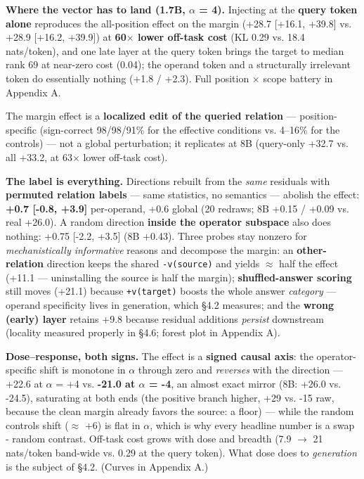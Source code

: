 \textbf{Where the vector has to land (1.7B, \ensuremath{\alpha} = 4).} Injecting at the
\textbf{query token alone} reproduces the all-position effect on the
margin (+28.7 {[}+16.1, +39.8{]} vs. +28.9 {[}+16.2, +39.9{]}) at
\textbf{60\ensuremath{\times} lower off-task cost} (KL 0.29 vs. 18.4 nats/token), and one
late layer at the query token brings the target to median rank 69 at
near-zero cost (0.04); the operand token and a structurally irrelevant
token do essentially nothing (+1.8 / +2.3). Full position \ensuremath{\times} scope
battery in Appendix A.

The margin effect is a \textbf{localized edit of the queried relation}
--- position-specific (sign-correct 98/98/91\% for the effective
conditions vs. 4--16\% for the controls) --- not a global perturbation;
it replicates at 8B (query-only +32.7 vs. all +33.2, at 63\ensuremath{\times} lower
off-task cost).

\textbf{The label is everything.} Directions rebuilt from the
\emph{same} residuals with \textbf{permuted relation labels} --- same
statistics, no semantics --- abolish the effect: \textbf{+0.7 {[}-0.8,
+3.9{]}} per-operand, +0.6 global (20 redraws; 8B +0.15 / +0.09 vs. real
+26.0). A random direction \textbf{inside the operator subspace} also
does nothing: +0.75 {[}-2.2, +3.5{]} (8B +0.43). Three probes stay
nonzero for \emph{mechanistically informative} reasons and decompose the
margin: an \textbf{other-relation} direction keeps the shared
\texttt{-v(source)} and yields \ensuremath{\approx} half the effect (+11.1 --- uninstalling
the source is half the margin); \textbf{shuffled-answer scoring} still
moves (+21.1) because \texttt{+v(target)} boosts the whole answer
\emph{category} --- operand specificity lives in generation, which \S{}4.2
measures; and the \textbf{wrong (early) layer} retains +9.8 because
residual additions \emph{persist} downstream (locality measured properly
in \S{}4.6; forest plot in Appendix A).

\textbf{Dose--response, both signs.} The effect is a \textbf{signed
causal axis}: the operator-specific shift is monotone in \ensuremath{\alpha} through zero
and \emph{reverses} with the direction --- +22.6 at \ensuremath{\alpha} = +4 vs.
\textbf{-21.0 at \ensuremath{\alpha} = -4}, an almost exact mirror (8B: +26.0 vs. -24.5),
saturating at both ends (the positive branch higher, +29 vs. -15 raw,
because the clean margin already favors the source: a floor) --- while
the random control\textquotesingle s shift (\ensuremath{\approx} +6) is flat in
\textbar \ensuremath{\alpha}\textbar, which is why every headline number is a swap -
random contrast. Off-task cost grows with dose and breadth (7.9 \ensuremath{\to} 21
nats/token band-wide vs. 0.29 at the query token). What dose does to
\emph{generation} is the subject of \S{}4.2. (Curves in Appendix A.)

